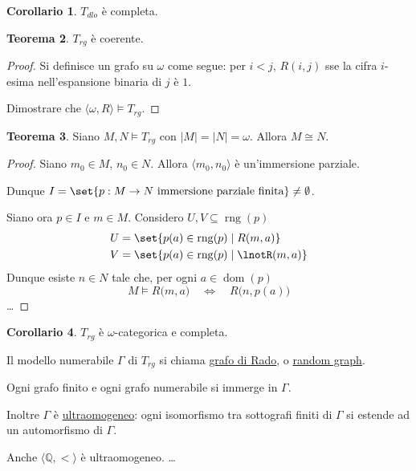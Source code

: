 \documentclass[10pt]{article}
\newcommand{\card}[1]{\left\vert #1 \right\vert}
\newcommand{\1}{\mathds{1}}
\newcommand{\Q}{\mathds{Q}}
\theoremstyle{definition}%
\newtheorem{thm}{Teorema}[section]
\newtheorem{cor}[thm]{Corollario}
\theoremstyle{plain}
\theoremstyle{remark}
\begin{document}
\begin{cor}
\(T_{dlo}\) è completa.
\end{cor}

\begin{thm}
\(T_{rg}\) è coerente.
\end{thm}

\begin{proof}
Si definisce un grafo su \(\omega\) come segue: per \(i<j\), \(R(i,j)\) sse la cifra \(i\)-esima nell'espansione binaria di \(j\) è \(1\).

Dimostrare che \(\langle \omega,R\rangle \vDash T_{rg}\).
\end{proof}

\begin{thm}
Siano \(M,N\vDash T_{rg}\) con \(\card{M}=\card{N}=\omega\). Allora \(M\cong N\).
\end{thm}

\begin{proof}
Siano \(m_{0} \in M\), \(n_{0} \in N\). Allora \(\langle m_{0},n_{0}\rangle\) è un'immersione parziale.

Dunque \(I=\set{p:M\to N\text{ immersione parziale finita}}\neq \emptyset\).

Siano ora \(p \in I\) e \(m \in M\). Considero \(U,V \subseteq \operatorname{rng}(p)\)
\begin{align*}
U&=\set{p(a) \in \operatorname{rng}(p)\mid R(m,a)}\\
V&=\set{p(a) \in \operatorname{rng}(p)\mid \lnotR(m,a)}
\end{align*}
Dunque esiste \(n \in N\) tale che, per ogni \(a \in \operatorname{dom}(p)\)
\begin{equation*}
M\vDash R\big(m,a\big)\quad\iff\quad R\big(n,p(a)\big)
\end{equation*}
\ldots{}
\end{proof}

\begin{cor}
\(T_{rg}\) è \(\omega\)-categorica e completa.
\end{cor}

Il modello numerabile \(\Gamma\) di \(T_{rg}\) si chiama \uline{grafo di Rado}, o \uline{random graph}.

Ogni grafo finito e ogni grafo numerabile si immerge in \(\Gamma\).

Inoltre \(\Gamma\) è \uline{ultraomogeneo}: ogni isomorfismo tra sottografi finiti di \(\Gamma\) si estende ad un automorfismo di \(\Gamma\).

Anche \(\langle\Q,<\rangle\) è ultraomogeneo. \ldots{}
\end{document}
